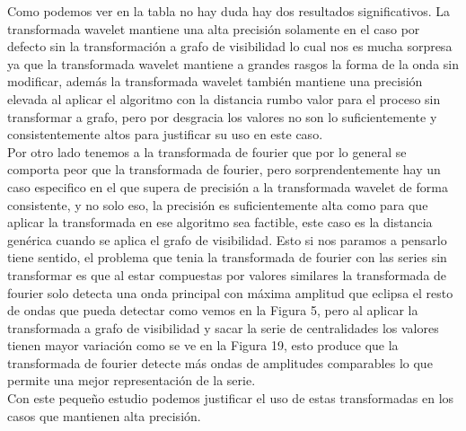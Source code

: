 \documentclass[12pt,a4paper]{article}
\begin{document}
		Como podemos ver en la tabla no hay duda hay dos resultados significativos. La transformada wavelet mantiene una alta precisión solamente en el caso por defecto sin la transformación a grafo de visibilidad lo cual nos es mucha sorpresa ya que la transformada wavelet mantiene a grandes rasgos la forma de la onda sin modificar, además la transformada wavelet también mantiene una precisión elevada al aplicar el algoritmo con la distancia rumbo valor para el proceso sin transformar a grafo, pero por desgracia los valores no son lo suficientemente y consistentemente altos para justificar su uso en este caso.\\
		Por otro lado tenemos a la transformada de fourier que por lo general se comporta peor que la transformada de fourier, pero sorprendentemente hay un caso especifico en el que supera de precisión a la transformada wavelet de forma consistente, y no solo eso, la precisión es suficientemente alta como para que aplicar la transformada en ese algoritmo sea factible, este caso es la distancia genérica cuando se aplica el grafo de visibilidad. Esto si nos paramos a pensarlo tiene sentido, el problema que tenia la transformada de fourier con las series sin transformar es que al estar compuestas por valores similares la transformada de fourier solo detecta una onda principal con máxima amplitud que eclipsa el resto de ondas que pueda detectar como vemos en la Figura 5, pero al aplicar la transformada a grafo de visibilidad y sacar la serie de centralidades los valores tienen mayor variación como se ve en la Figura 19, esto produce que la transformada de fourier detecte más ondas de amplitudes comparables lo que permite una mejor representación de la serie.\\
		Con este pequeño estudio podemos justificar el uso de estas transformadas en los casos que mantienen alta precisión.\\
\end{document}
